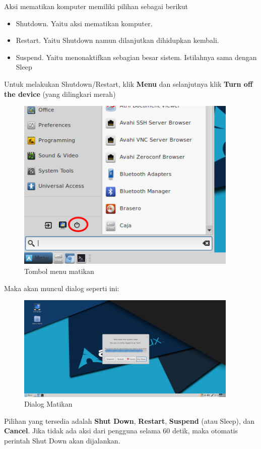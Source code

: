 \documentclass[12pt,]{article}
\begin{document}
	Aksi mematikan komputer memiliki pilihan sebagai berikut
	\begin{itemize}
		\item Shutdown. Yaitu aksi mematikan komputer.
		\item Restart. Yaitu Shutdown namun dilanjutkan dihidupkan kembali.
		\item Suspend. Yaitu menonaktifkan sebagian besar sistem. Istilahnya sama dengan Sleep
	\end{itemize}
	
	Untuk melakukan Shutdown/Restart, klik \textbf{Menu} dan selanjutnya klik \textbf{Turn off the device} (yang dilingkari merah)

	\begin{figure}[!ht]
		\centering
		\includegraphics[width=300pt]{png/turnoff}
		\caption{Tombol menu matikan}
	\end{figure}

	Maka akan muncul dialog seperti ini:

	\begin{figure}[!ht]
		\centering
		\includegraphics[width=300pt]{png/turnoffdlg}
		\caption{Dialog Matikan}
	\end{figure}

	Pilihan yang tersedia adalah \textbf{Shut Down}, \textbf{Restart}, \textbf{Suspend} (atau Sleep), dan \textbf{Cancel}.
	Jika tidak ada aksi dari pengguna selama 60 detik, maka otomatis perintah Shut Down akan dijalankan.
\end{document}
